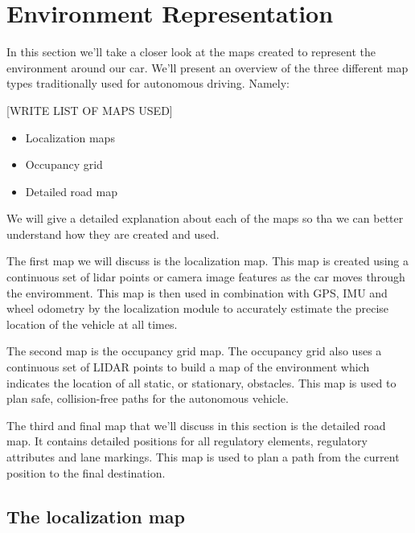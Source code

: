 \section{Environment Representation}
\label{environment_representation}

In this section we'll take a closer look at the maps created to represent the environment around our car. We'll present an overview of the three
different map types traditionally used for autonomous driving. Namely:

[WRITE LIST OF MAPS USED]

\begin{itemize}
\item Localization maps 
\item Occupancy grid
\item Detailed road map
\end{itemize}

We will give  a detailed explanation about each of the maps so tha we can better understand how they are created
and used. 

The first map we will discuss is the localization map. This map is created using
a continuous set of lidar points or camera image features as the car
moves through the enviromment. This map is then used in
combination with GPS, IMU and wheel odometry by the localization module to accurately estimate the precise
location of the vehicle at all times. 

The second map is the occupancy grid map. The occupancy grid also uses a continuous
set of LIDAR points to build a map of the environment which indicates
the location of all static, or stationary, obstacles. This map is used to plan safe,
collision-free paths for the autonomous vehicle. 

The third and final map that we'll discuss
in this section is the detailed road map. It contains detailed positions for all regulatory elements,
regulatory attributes and lane markings. This map is used to plan a path from the
current position to the final destination. 


\subsection{The localization map}

